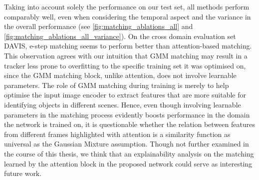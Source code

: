 \vspace{7mm}

 Taking into account solely the performance on our test set, all methods perform comparably well, even when considering the temporal aspect and the variance in the overall performance (see  \figref\ref{fig:matching_ablations_all} and \figref\ref{fig:matching_ablations_all_variance}). On the cross domain evaluation set DAVIS, e-step matching seems to perform better than attention-based matching. This observation agrees with our intuition 
 that GMM matching may result in a tracker less prone to overfitting to the specific training set it was optimised on, since the GMM matching block, unlike attention, does not involve learnable parameters. The role of GMM matching during training is merely to help optimise the input image encoder to extract features that are more suitable for identifying objects in different scenes. Hence, even though involving learnable parameters in the matching process evidently boosts performance in the domain the network is trained on, it is questionable whether the relation between features from different frames highlighted with attention is a similarity function as universal as the Gaussian Mixture assumption.
 Though not further examined in the course of this thesis, we think that an explainability analysis on the matching learned by the attention block in the proposed network could serve as interesting future work.
 \par


